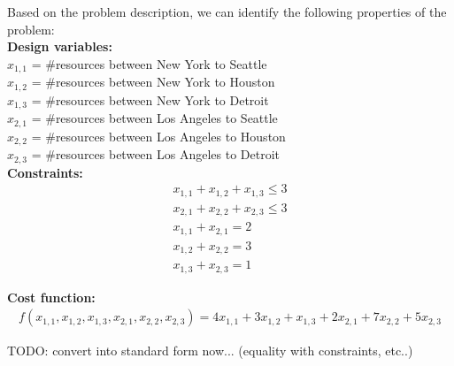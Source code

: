 \documentclass[11pt]{article}
\begin{document}
\begin{prob}{2}
\end{prob}
\begin{sol} 

Based on the problem description, we can identify the following properties of the problem: \\

\textbf{Design variables:}\\ 
$x_{1,1}$ = \#resources between New York to Seattle\\
$x_{1,2}$ = \#resources between New York to Houston\\
$x_{1,3}$ = \#resources between New York to Detroit \\
$x_{2,1}$ = \#resources between Los Angeles to Seattle \\
$x_{2,2}$ = \#resources between Los Angeles to Houston \\
$x_{2,3}$ = \#resources between Los Angeles to Detroit \\

\textbf{Constraints:} 
\begin{eqnarray*}
x_{1,1} + x_{1,2} + x_{1,3} \leq 3 \\
x_{2,1} + x_{2,2} + x_{2,3} \leq 3 \\
x_{1,1} + x_{2,1} = 2 \\
x_{1,2} + x_{2,2} = 3 \\
x_{1,3} + x_{2,3} = 1 
\end{eqnarray*}

\textbf{Cost function:}
\begin{eqnarray*}
f(x_{1,1},x_{1,2},x_{1,3},x_{2,1},x_{2,2},x_{2,3}) = 4x_{1,1} + 3x_{1,2} + x_{1,3} + 2x_{2,1} + 7x_{2,2} + 5x_{2,3}
\end{eqnarray*}

TODO: convert into standard form now... (equality with constraints, etc..)

\end{sol}
\end{document}
